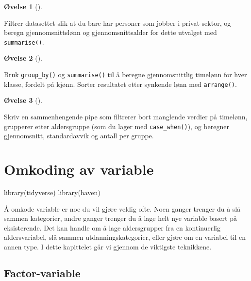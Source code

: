 \documentclass[
  norsk,
  letterpaper,
  DIV=11,
  numbers=noendperiod]{scrreprt}
\newenvironment{Shaded}{\begin{snugshade}}{\end{snugshade}}
\newcommand{\FunctionTok}[1]{\textcolor[rgb]{0.28,0.35,0.67}{#1}}
\newcommand{\NormalTok}[1]{\textcolor[rgb]{0.00,0.23,0.31}{#1}}
\theoremstyle{definition}
\newtheorem{exercise}{Øvelse}[chapter]
\theoremstyle{remark}
\begin{document}
\begin{exercise}[]\protect\hypertarget{exr-}{}\label{exr-}

Filtrer datasettet slik at du bare har personer som jobber i privat
sektor, og beregn gjennomsnittslønn og gjennomsnittsalder for dette
utvalget med \texttt{summarise()}.

\end{exercise}

\begin{exercise}[]\protect\hypertarget{exr-}{}\label{exr-}

Bruk \texttt{group\_by()} og \texttt{summarise()} til å beregne
gjennomsnittlig timelønn for hver klasse, fordelt på kjønn. Sorter
resultatet etter synkende lønn med \texttt{arrange()}.

\end{exercise}

\begin{exercise}[]\protect\hypertarget{exr-}{}\label{exr-}

Skriv en sammenhengende pipe som filtrerer bort manglende verdier på
timelønn, grupperer etter aldersgruppe (som du lager med
\texttt{case\_when()}), og beregner gjennomsnitt, standardavvik og
antall per gruppe.

\end{exercise}

\chapter{Omkoding av variable}\label{omkoding-av-variable}

\begin{Shaded}
\begin{Highlighting}[]
\FunctionTok{library}\NormalTok{(tidyverse)}
\FunctionTok{library}\NormalTok{(haven)}
\end{Highlighting}
\end{Shaded}

Å omkode variable er noe du vil gjøre veldig ofte. Noen ganger trenger
du å slå sammen kategorier, andre ganger trenger du å lage helt nye
variable basert på eksisterende. Det kan handle om å lage aldersgrupper
fra en kontinuerlig aldersvariabel, slå sammen utdanningskategorier,
eller gjøre om en variabel til en annen type. I dette kapittelet går vi
gjennom de viktigste teknikkene.

\section{Factor-variable}\label{factor-variable}
\end{document}
